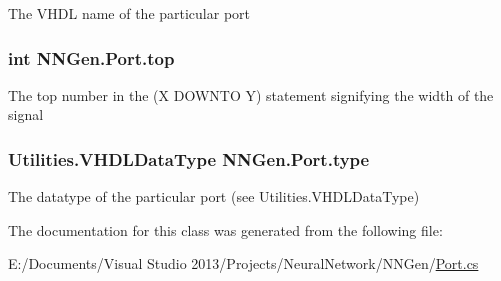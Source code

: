 The V\+H\+D\+L name of the particular port 

\hypertarget{class_n_n_gen_1_1_port_ad68cf9376f181c135381671f67f03149}{}
\subsubsection[{top}]{\setlength{\rightskip}{0pt plus 5cm}int N\+N\+Gen.\+Port.\+top\hspace{0.3cm}{\ttfamily [get]}}\label{class_n_n_gen_1_1_port_ad68cf9376f181c135381671f67f03149}


The top number in the (X D\+O\+W\+N\+T\+O Y) statement signifying the width of the signal 

\hypertarget{class_n_n_gen_1_1_port_a2b45b890a0e945e39d37a1cc596d1d20}{}
\subsubsection[{type}]{\setlength{\rightskip}{0pt plus 5cm}Utilities.\+V\+H\+D\+L\+Data\+Type N\+N\+Gen.\+Port.\+type\hspace{0.3cm}{\ttfamily [get]}}\label{class_n_n_gen_1_1_port_a2b45b890a0e945e39d37a1cc596d1d20}


The datatype of the particular port (see Utilities.\+V\+H\+D\+L\+Data\+Type) 



The documentation for this class was generated from the following file\+:\begin{DoxyCompactItemize}
\item 
E\+:/\+Documents/\+Visual Studio 2013/\+Projects/\+Neural\+Network/\+N\+N\+Gen/\hyperlink{_port_8cs}{Port.\+cs}\end{DoxyCompactItemize}
